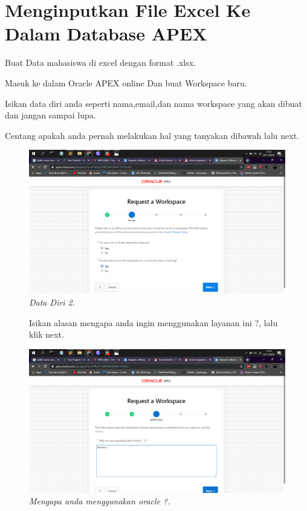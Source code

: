 \chapter{Menginputkan File Excel Ke Dalam Database APEX}

\begin{enumerate}
\item[1]Buat Data mahasiswa di excel dengan format .xlsx.
\item[2]Masuk ke dalam Oracle APEX online Dan buat Workspace baru.
\item[3]Isikan data diri anda seperti nama,email,dan nama workspace yang akan dibuat dan jangan sampai lupa.
\item[4]Centang apakah anda pernah melakukan hal yang tanyakan dibawah lalu next. \begin{figure}[!htbp]
    \begin{center}
\includegraphics[scale=0.2]{figures/3.png}
    \caption{\textit{Data Diri 2.}}
        \end{center}
        \end{figure}
\begin{figure}
\item[5]Isikan alasan mengapa anda ingin menggunakan layanan ini ?, lalu klik next.

    \begin{center}
\includegraphics[scale=0.2]{figures/4.png}
    \caption{\textit{Mengapa anda menggunakan oracle ?.}}
        \end{center}


\end{figure}
\end{enumerate}
